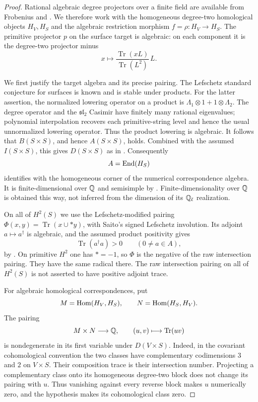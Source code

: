 \begin{proof}
Rational algebraic degree projectors over a finite field are available
from Frobenius and
\citet[Theorem~2(1), pp.~76--77]{c_katzmessing1974}.
We therefore work with the homogeneous degree-two homological
objects $H_V,H_S$ and the algebraic restriction morphism
$f=\rho:H_V\to H_S$.
The primitive projector $p$ on the surface target is algebraic:
on each component it is the degree-two projector minus
\[
 x\longmapsto
 \frac{\operatorname{Tr}(xL)}{\operatorname{Tr}(L^2)}\,L.
\]

We first justify the target algebra and its precise pairing.
The Lefschetz standard conjecture for surfaces is known and is
stable under products. For the latter assertion, the normalized
lowering operator on a product is
$\Lambda_1\otimes1+1\otimes\Lambda_2$.
The degree operator and the $\mathfrak{sl}_2$ Casimir have finitely
many rational eigenvalues; polynomial interpolation recovers
each primitive-string level and hence the usual unnormalized
lowering operator. Thus the product lowering is algebraic.
It follows that $B(S\times S)$, and hence $A(S\times S)$, holds.
Combined with the assumed $I(S\times S)$, this gives $D(S\times S)$
as in \citet[\S4.1, pp.~14--15]{c_msaito2003positivity}.
Consequently
\[
 A=\operatorname{End}(H_S)
\]
identifies with the homogeneous corner of the numerical
correspondence algebra. It is finite-dimensional over $\mathbb Q$ and
semisimple by \citet[Theorem~1, pp.~448--449]
{c_jannsen1992semisimple}.
Finite-dimensionality over $\mathbb Q$ is obtained this way, not inferred
from the dimension of its $\mathbb Q_\ell$ realization.

On all of $H^2(S)$ we use the Lefschetz-modified pairing
$\Phi(x,y)=\operatorname{Tr}(x\cup *y)$, with Saito's signed
Lefschetz involution. Its adjoint $a\mapsto a^\dagger$ is algebraic,
and the assumed product positivity gives
\begin{equation}
\label{eq:c-target-positive-trace}
 \operatorname{Tr}(a^\dagger a)>0\qquad(0\ne a\in A),
\end{equation}
by \citet[equation~(4.1.3), p.~15]{c_msaito2003positivity}.
On primitive $H^2$ one has $*=-1$, so $\Phi$ is the negative
of the raw intersection pairing. They have the same radical
there. The raw intersection pairing on all of $H^2(S)$ is
not asserted to have positive adjoint trace.

For algebraic homological correspondences, put
\[
 M=\operatorname{Hom}(H_V,H_S),\qquad N=\operatorname{Hom}(H_S,H_V).
\]
The pairing
\[
 M\times N\longrightarrow\mathbb Q,\qquad
 (u,v)\longmapsto\operatorname{Tr}(uv)
\]
is nondegenerate in its first variable under $D(V\times S)$.
Indeed, in the covariant cohomological convention the two
classes have complementary codimensions $3$ and $2$ on
$V\times S$. Their composition trace is their intersection
number. Projecting a complementary class onto its homogeneous
degree-two block does not change its pairing with $u$.
Thus vanishing against every reverse block makes $u$
numerically zero, and the hypothesis makes its cohomological
class zero.


\end{proof}
